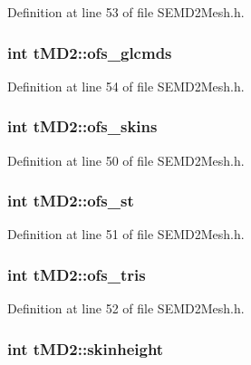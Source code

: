 Definition at line 53 of file S\+E\+M\+D2\+Mesh.\+h.

\subsubsection[{ofs\+\_\+glcmds}]{\setlength{\rightskip}{0pt plus 5cm}int t\+M\+D2\+::ofs\+\_\+glcmds}\label{structt_m_d2_a1421709cc93e6b84a1ee0701ff6356af}


Definition at line 54 of file S\+E\+M\+D2\+Mesh.\+h.

\subsubsection[{ofs\+\_\+skins}]{\setlength{\rightskip}{0pt plus 5cm}int t\+M\+D2\+::ofs\+\_\+skins}\label{structt_m_d2_a803393508b310f07176b1c13ec3b7181}


Definition at line 50 of file S\+E\+M\+D2\+Mesh.\+h.

\subsubsection[{ofs\+\_\+st}]{\setlength{\rightskip}{0pt plus 5cm}int t\+M\+D2\+::ofs\+\_\+st}\label{structt_m_d2_a66615519217323f7ed2c3ff61911544d}


Definition at line 51 of file S\+E\+M\+D2\+Mesh.\+h.

\subsubsection[{ofs\+\_\+tris}]{\setlength{\rightskip}{0pt plus 5cm}int t\+M\+D2\+::ofs\+\_\+tris}\label{structt_m_d2_a4326913dc766345058886df88f441dcc}


Definition at line 52 of file S\+E\+M\+D2\+Mesh.\+h.

\subsubsection[{skinheight}]{\setlength{\rightskip}{0pt plus 5cm}int t\+M\+D2\+::skinheight}\label{structt_m_d2_a8ddebc159ee009983157f119fd98a58b}


